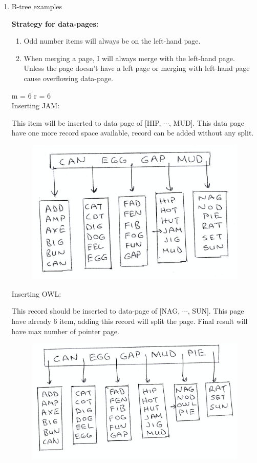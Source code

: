 \documentclass[12pt]{article}
\begin{document}
\begin{enumerate}
    \item B-tree examples
    
    \textbf{Strategy for data-pages: }
    \begin{enumerate}
        \item Odd number items will always be on the left-hand page.
        \item When merging a page, I will always merge with the left-hand page. Unless the page doesn't have a left page or merging with left-hand page cause overflowing data-page.
    \end{enumerate}

    m = 6 r = 6\\
    Inserting JAM:

    This item will be inserted to data page of [HIP, $\cdots$, MUD]. This data page have one more record space available, record can be added without any split.

    \begin{figure}[H] \label{fig:insertjam}
        \centering
        \includegraphics[width=\textwidth]{img/insertjam.png}
    \end{figure}

    Inserting OWL:

    This record should be inserted to data-page of [NAG, $\cdots$, SUN]. This page have already 6 item, adding this record will split the page. Final result will have max number of pointer page.

    \begin{figure}[H] \label{fig:insertowl}
        \centering
        \includegraphics[width=\textwidth]{img/insertowl.png}
    \end{figure}


\end{enumerate}
\end{document}
